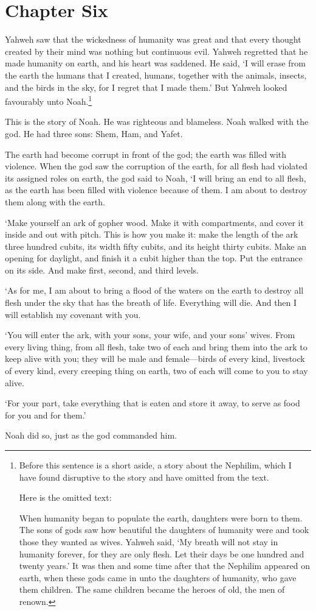 \chapter*{Chapter Six}

Yahweh saw that the wickedness
of humanity was great
and that every thought created by their mind
was nothing but continuous evil.
Yahweh regretted that he made humanity on earth,
and his heart was saddened.
He said, `I will erase from the earth 
the humans that I created,
humans, together with the animals, insects, and the birds in the sky,
for I regret that I made them.'
But Yahweh looked favourably unto Noah.\footnote{
    Before this sentence is a short aside, 
    a story about the Nephilim,
    which I have found disruptive to the story
    and have omitted from the text. 
    
    Here is the omitted text:

    When humanity began to populate the earth,
    daughters were born to them.
    The sons of gods saw how beautiful
    the daughters of humanity were 
    and took those they wanted as wives.
    Yahweh said, `My breath will not stay in humanity forever,
    for they are only flesh.
    Let their days be one hundred and twenty years.'
    It was then and some time after
    that the Nephilim appeared on earth,
    when these gods came in unto the daughters of humanity,
    who gave them children.
    The same children became the heroes of old,
    the men of renown.
} 

This is the story of Noah.
He was righteous and blameless.
Noah walked with the god. 
He had three sons: Shem, Ham, and Yafet.

The earth had become corrupt in front of the god;
the earth was filled with violence.
When the god saw the corruption of the earth,
for all flesh had violated its assigned roles on earth,
the god said to Noah, `I will bring an end to all flesh,
as the earth has been filled with violence because of them.
I am about to destroy them along with the earth.

`Make yourself an ark of gopher wood.
Make it with compartments, 
and cover it inside and out with pitch.
This is how you make it:
make the length of the ark three hundred cubits,
its width fifty cubits, 
and its height thirty cubits.
Make an opening for daylight, 
and finish it a cubit higher than the top.
Put the entrance on its side.
And make first, second, and third levels.

`As for me,
I am about to bring a flood of the waters on the earth 
to destroy all flesh under the sky that has the breath of life.
Everything will die.
And then I will establish my covenant with you.

`You will enter the ark, 
with your sons,
your wife,
and your sons' wives. 
From every living thing,
from all flesh,
take two of each and bring them into the ark 
to keep alive with you;
they will be male and female---birds of every kind,
livestock of every kind,
every creeping thing on earth,
two of each will come to you to stay alive.

`For your part,
take everything that is eaten and store it away,
to serve as food for you 
and for them.'

Noah did so, just as the god commanded him.